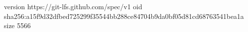 version https://git-lfs.github.com/spec/v1
oid sha256:a15f9d32dfbed725299f35544bb288ce84704b9da0bf05d81cd68763541bea1a
size 5566
